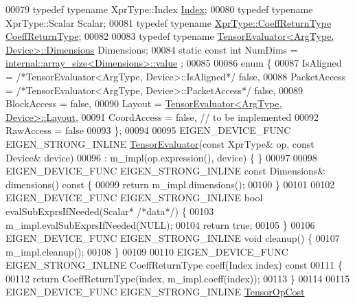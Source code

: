 \begin{DoxyCode}
00079   \textcolor{keyword}{typedef} \textcolor{keyword}{typename} XprType::Index \hyperlink{namespace_eigen_a62e77e0933482dafde8fe197d9a2cfde}{Index};
00080   \textcolor{keyword}{typedef} \textcolor{keyword}{typename} XprType::Scalar Scalar;
00081   \textcolor{keyword}{typedef} \textcolor{keyword}{typename} \hyperlink{struct_eigen_1_1_tuple}{XprType::CoeffReturnType} 
      \hyperlink{struct_eigen_1_1_tuple}{CoeffReturnType};
00082 
00083   \textcolor{keyword}{typedef} \textcolor{keyword}{typename} \hyperlink{struct_eigen_1_1_tensor_evaluator}{TensorEvaluator<ArgType, Device>::Dimensions}
       Dimensions;
00084   \textcolor{keyword}{static} \textcolor{keyword}{const} \textcolor{keywordtype}{int} NumDims = \hyperlink{struct_eigen_1_1internal_1_1array__size}{internal::array\_size<Dimensions>::value}
      ;
00085 
00086   \textcolor{keyword}{enum} \{
00087     IsAligned = \textcolor{comment}{/*TensorEvaluator<ArgType, Device>::IsAligned*/} \textcolor{keyword}{false},
00088     PacketAccess = \textcolor{comment}{/*TensorEvaluator<ArgType, Device>::PacketAccess*/} \textcolor{keyword}{false},
00089     BlockAccess = \textcolor{keyword}{false},
00090     Layout = \hyperlink{struct_eigen_1_1_tensor_evaluator}{TensorEvaluator<ArgType, Device>::Layout},
00091     CoordAccess = \textcolor{keyword}{false},  \textcolor{comment}{// to be implemented}
00092     RawAccess = \textcolor{keyword}{false}
00093   \};
00094 
00095   EIGEN\_DEVICE\_FUNC EIGEN\_STRONG\_INLINE \hyperlink{struct_eigen_1_1_tensor_evaluator}{TensorEvaluator}(\textcolor{keyword}{const} XprType& op, \textcolor{keyword}{const} Device& 
      device)
00096       : m\_impl(op.expression(), device) \{ \}
00097 
00098   EIGEN\_DEVICE\_FUNC EIGEN\_STRONG\_INLINE \textcolor{keyword}{const} Dimensions& dimensions()\textcolor{keyword}{ const }\{
00099     \textcolor{keywordflow}{return} m\_impl.dimensions();
00100   \}
00101 
00102   EIGEN\_DEVICE\_FUNC EIGEN\_STRONG\_INLINE \textcolor{keywordtype}{bool} evalSubExprsIfNeeded(Scalar* \textcolor{comment}{/*data*/}) \{
00103     m\_impl.evalSubExprsIfNeeded(NULL);
00104     \textcolor{keywordflow}{return} \textcolor{keyword}{true};
00105   \}
00106   EIGEN\_DEVICE\_FUNC EIGEN\_STRONG\_INLINE \textcolor{keywordtype}{void} cleanup() \{
00107     m\_impl.cleanup();
00108   \}
00109 
00110   EIGEN\_DEVICE\_FUNC EIGEN\_STRONG\_INLINE CoeffReturnType coeff(Index index)\textcolor{keyword}{ const}
00111 \textcolor{keyword}{  }\{
00112     \textcolor{keywordflow}{return} CoeffReturnType(index, m\_impl.coeff(index));
00113   \}
00114 
00115   EIGEN\_DEVICE\_FUNC EIGEN\_STRONG\_INLINE \hyperlink{class_eigen_1_1_tensor_op_cost}{TensorOpCost}

\end{DoxyCode}
